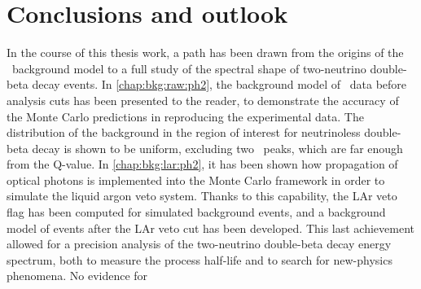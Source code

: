 
\chapter*{Conclusions and outlook}%
\label{chap:concl}

In the course of this thesis work, a path has been drawn from the origins of the \gerda\
background model to a full study of the spectral shape of two-neutrino double-beta decay
events. In \cref{chap:bkg:raw:ph2}, the background model of \gerdatwo\ data before
analysis cuts has been presented to the reader, to demonstrate the accuracy of the Monte
Carlo predictions in reproducing the experimental data. The distribution of the background
in the region of interest for neutrinoless double-beta decay is shown to be uniform,
excluding two \g\ peaks, which are far enough from the Q-value. In
\cref{chap:bkg:lar:ph2}, it has been shown how propagation of optical photons is
implemented into the Monte Carlo framework in order to simulate the liquid argon veto
system. Thanks to this capability, the LAr veto flag has been computed for simulated
background events, and a background model of events after the LAr veto cut has been
developed. This last achievement allowed for a precision analysis of the two-neutrino
double-beta decay energy spectrum, both to measure the process half-life and to search for
new-physics phenomena. No evidence for

